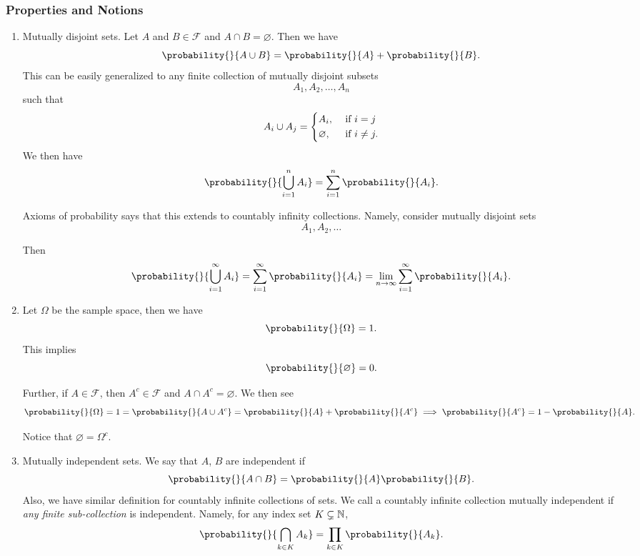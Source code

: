 \subsubsection{Properties and Notions}
\begin{enumerate}
	\item Mutually disjoint sets. Let \(A\) and \(B\in\mathcal{F}\) and \(A\cap B = \varnothing\). Then we have
	      \[
		      \probability{}{A\cup B} = \probability{}{A} + \probability{}{B}.
	      \]
	      This can be easily generalized to any finite collection of mutually disjoint subsets
	      \[
		      A_1, A_2, \ldots , A_n
	      \]
	      such that
	      \[
		      A_i \cup A_j = \begin{dcases}
			      A_i,         & \text{ if }i = j    \\
			      \varnothing, & \text{ if }i\neq j.
		      \end{dcases}
	      \]
	      We then have \[
		      \probability{}{\bigcup\limits_{i = 1}^n A_{i}} = \sum\limits_{i=1}^{n} \probability{}{A_{i}}.
	      \]
	      \begin{remark}
		      Axioms of probability says that this extends to countably infinity collections. Namely, consider mutually disjoint sets
		      \[
			      A_1, A_2, \ldots
		      \]

		      Then
		      \[
			      \probability{}{\bigcup\limits_{i=1}^{\infty} A_{i}} = \sum\limits_{i=1}^{\infty} \probability{}{A_{i}} = \lim_{n \to \infty} \sum\limits_{i=1}^{\infty} \probability{}{A_{i}}.
		      \]
	      \end{remark}
	\item Let \(\Omega\) be the sample space, then we have
	      \[
		      \probability{}{\Omega} = 1.
	      \]
	      This implies
	      \[
		      \probability{}{\varnothing } = 0.
	      \]

	      Further, if \(A\in\mathcal{F}\), then \(A^{c}\in\mathcal{F}\) and \(A\cap A^{c}= \varnothing \). We then see
	      \[
		      \probability{}{\Omega} = 1 = \probability{}{A\cup A^{c}} = \probability{}{A} + \probability{}{A^{c}} \implies \probability{}{A^{c}} = 1 - \probability{}{A}.
	      \]

	      Notice that \(\varnothing  = \Omega^{c}\).
	\item Mutually independent sets. We say that \(A\), \(B\) are independent if
	      \[
		      \probability{}{A\cap B} = \probability{}{A}\probability{}{B}.
	      \]
	      Also, we have similar definition for countably infinite collections of sets. We call a countably infinite collection mutually independent if \emph{any finite sub-collection}
	      is independent. Namely, for any index set \(K\subsetneq \mathbb{\MakeUppercase{N}}\),
	      \[
		      \probability{}{\bigcap\limits_{k\in K} A_k } = \prod_{k\in K} \probability{}{A_k}.
	      \]
\end{enumerate}

